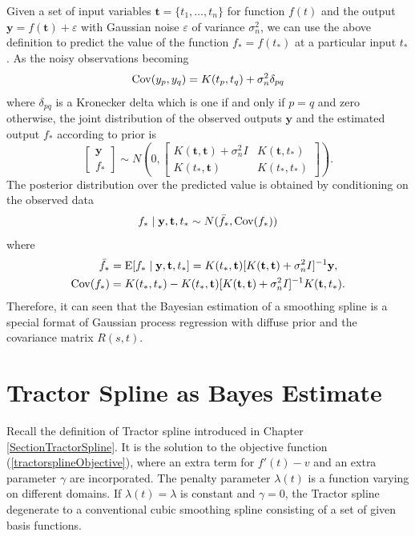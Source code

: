 Given a set of input variables $\mathbf{t} = \{t_1,\ldots,t_n\}$ for function $f(t)$ and the output $\mathbf{y}=f(\mathbf{t})+\varepsilon$ with \iid  Gaussian noise $\varepsilon$ of variance $\sigma_n^2$,  we can use the above definition to predict the value of the function $f_*=f(t_*)$ at a particular input $t_*$. As the noisy observations becoming
\begin{equation*} %
\Cov (y_p,y_q) = K(t_p,t_q)+\sigma_n^2 \delta_{pq}
\end{equation*}
where $\delta_{pq}$ is a Kronecker delta which is one if and only if $p=q$ and zero otherwise, the joint distribution of the observed outputs $\mathbf{y}$ and the estimated output $f_*$ according to prior is
\begin{equation}
\begin{bmatrix}
\mathbf{y}\\
f_*
\end{bmatrix} \sim N \left(  
0,  \begin{bmatrix}
K(\mathbf{t},\mathbf{t}) +\sigma_n^2I& K(\mathbf{t},t_*) \\
K(t_*,\mathbf{t}) & K(t_*,t_*)
\end{bmatrix} 
\right).
\end{equation}
The posterior distribution over the predicted value is obtained by conditioning on the observed data
\begin{equation*}
f_* \mid  \mathbf{y},\mathbf{t},t_* \sim N(\bar{f_*},\mathrm{Cov} (f_*))
\end{equation*}
where 
\begin{align}
\bar{f_*}&=\mathrm{E} [f_* \mid  \mathbf{y},\mathbf{t},t_* ]=K(t_*,\mathbf{t})[K(\mathbf{t},\mathbf{t})+\sigma_n^2I]^{-1}\mathbf{y},\\
\mathrm{Cov}(f_*)&=K(t_*,t_*)-K(t_*,\mathbf{t})[K(\mathbf{t},\mathbf{t})+\sigma_n^2I]^{-1}K(\mathbf{t},t_*).
\end{align}
Therefore, it can seen that the Bayesian estimation of a smoothing spline is a special format of Gaussian process regression with diffuse prior and the covariance matrix $R(s,t)$. 





\section{Tractor Spline as Bayes Estimate}


Recall the definition of Tractor spline introduced in Chapter \ref{SectionTractorSpline}. It is the solution to the objective function (\ref{tractorsplineObjective}), where an extra term for $f'(t)-v$ and an extra parameter $\gamma$ are incorporated. The penalty parameter $\lambda(t)$ is a function varying on different domains. If $\lambda(t)=\lambda$ is constant and $\gamma=0$, the Tractor spline degenerate to a conventional cubic smoothing spline consisting of a set of given basis functions.  

